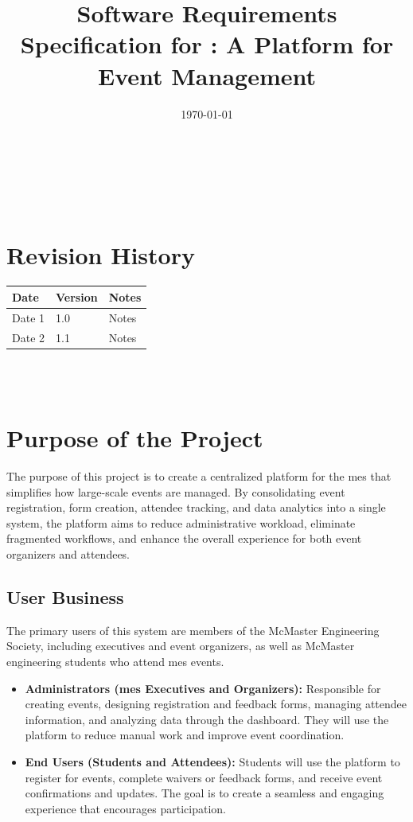 \documentclass[12pt]{article}
\begin{document}
\title{Software Requirements Specification for \progname: A Platform for Event Management }
\author{\authname}
\date{\today}

\maketitle
~\newpage

\tableofcontents

~\newpage

\section*{Revision History}

\begin{tabularx}{\textwidth}{p{3cm}p{2cm}X}
\toprule {\textbf{Date}} & {\textbf{Version}} & {\textbf{Notes}}\\
\midrule
Date 1 & 1.0 & Notes\\
Date 2 & 1.1 & Notes\\
\bottomrule
\end{tabularx}

~\\

~\newpage
\section{Purpose of the Project}

The purpose of this project is to create a centralized platform for the \gls{mes} that simplifies how large-scale events
are managed. By consolidating event registration, form creation, attendee tracking, and data analytics into a single
system, the platform aims to reduce administrative workload, eliminate fragmented workflows, and enhance the overall
experience for both event organizers and attendees.

\subsection{User Business}

The primary users of this system are members of the McMaster Engineering Society, including executives and event
organizers, as well as McMaster engineering students who attend \gls{mes} events.

\begin{itemize}
    \item \textbf{Administrators (\gls{mes} Executives and Organizers):} Responsible for creating events, designing
      registration and feedback forms, managing attendee information, and analyzing data through the dashboard. They
      will use the platform to reduce manual work and improve event coordination.
    \item \textbf{End Users (Students and Attendees):} Students will use the platform to register for events, complete
      waivers or feedback forms, and receive event confirmations and updates. The goal is to create a seamless and
      engaging experience that encourages participation.
\end{itemize}
\end{document}
